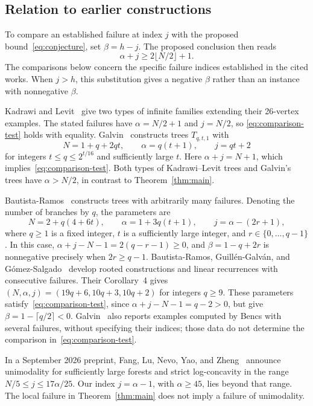 \documentclass[11pt,a4paper]{article}
\theoremstyle{remark}
\numberwithin{equation}{section}
\begin{document}
\subsection{Relation to earlier constructions}\label{sec:related}

To compare an established failure at index $j$ with the proposed
bound~\eqref{eq:conjecture}, set $\beta=h-j$. The proposed conclusion
then reads
\begin{equation}\label{eq:comparison-test}
 \alpha+j\geq2\lfloor N/2\rfloor+1.
\end{equation}
The comparisons below concern the specific failure indices established
in the cited works. When $j>h$, this substitution gives a negative
$\beta$ rather than an instance with nonnegative $\beta$.

Kadrawi and Levit~\cite[Sections~3--4]{KadrawiLevit2023} give two
types of infinite families extending their 26-vertex examples.
The stated failures have $\alpha=N/2+1$ and $j=N/2$, so
\eqref{eq:comparison-test} holds with equality.
Galvin~\cite[Theorem~2.1]{Galvin2026} constructs trees $T_{q,t,1}$ with
\[
 N=1+q+2qt,\qquad \alpha=q(t+1),\qquad j=qt+2
\]
for integers $t\leq q\leq2^{t/16}$ and sufficiently large $t$.
Here $\alpha+j=N+1$, which implies~\eqref{eq:comparison-test}.
Both types of Kadrawi--Levit trees and Galvin's trees have
$\alpha>N/2$, in contrast to Theorem~\ref{thm:main}.

Bautista-Ramos~\cite[Definition~1 and Theorem~1]{BautistaRamos2025}
constructs trees with arbitrarily many failures. Denoting the number
of branches by $q$, the parameters are
\[
 N=2+q(4+6t),\qquad \alpha=1+3q(t+1),\qquad
 j=\alpha-(2r+1),
\]
where $q\geq1$ is a fixed integer, $t$ is a sufficiently large
integer, and $r\in\{0,\ldots,q-1\}$. In this case,
$\alpha+j-N-1=2(q-r-1)\geq0$, and
$\beta=1-q+2r$ is nonnegative precisely when $2r\geq q-1$.
Bautista-Ramos, Guill\'en-Galv\'an, and G\'omez-Salgado~\cite{BGG2026}
develop rooted constructions and linear recurrences with consecutive
failures. Their Corollary~4 gives
$(N,\alpha,j)=(19q+6,10q+3,10q+2)$ for integers $q\geq9$.
These parameters satisfy~\eqref{eq:comparison-test}, since
$\alpha+j-N-1=q-2>0$, but give
$\beta=1-\lceil q/2\rceil<0$.
Galvin~\cite[Section~3]{Galvin2026} also reports examples computed by
Bencs with several failures, without specifying their indices;
those data do not determine the comparison in~\eqref{eq:comparison-test}.

In a September 2026 preprint, Fang, Lu, Nevo, Yao, and
Zheng~\cite[Theorems~1.1--1.2]{Fang2026} announce unimodality for
sufficiently large forests and strict log-concavity in the range
$N/5\leq j\leq17\alpha/25$.
Our index $j=\alpha-1$, with $\alpha\geq45$, lies beyond that range.
The local failure in Theorem~\ref{thm:main} does not imply a failure
of unimodality.
\end{document}
